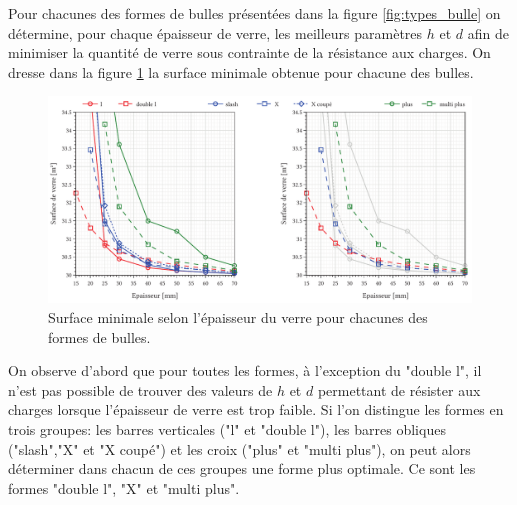 \documentclass[11pt,titlepage]{article}
\begin{document}
Pour chacunes des formes de bulles présentées dans la figure \ref{fig:types_bulle} on détermine, pour chaque épaisseur de verre, les meilleurs paramètres $h$ et $d$ afin de minimiser la quantité de verre sous contrainte de la résistance aux charges. On dresse dans la figure \ref{fig:surf_bulle} la surface minimale obtenue pour chacune des bulles.

\begin{figure}[H]
    \centering
    \includegraphics[width=\linewidth]{img/bulle/surf_bulle.pdf}
    \caption{Surface minimale selon l'épaisseur du verre pour chacunes des formes de bulles.}
    \label{fig:surf_bulle}
\end{figure}

On observe d'abord que pour toutes les formes, à l'exception du "double l", il n'est pas possible de trouver des valeurs de $h$ et $d$ permettant de résister aux charges lorsque l'épaisseur de verre est trop faible. Si l'on distingue les formes en trois groupes: les barres verticales ("l" et "double l"), les barres obliques ("slash","X" et "X coupé") et les croix ("plus" et "multi plus"), on peut alors déterminer dans chacun de ces groupes une forme plus optimale. Ce sont les formes "double l", "X" et "multi plus".
\end{document}
